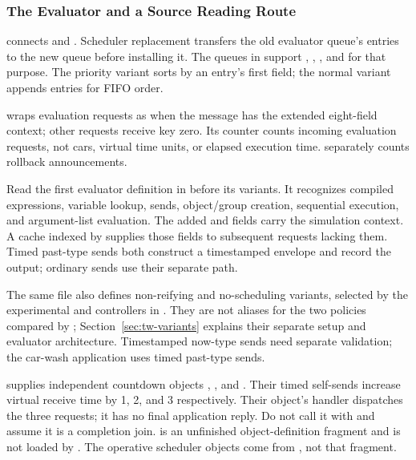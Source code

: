 

\subsubsection{The Evaluator and a Source Reading Route}
\label{sec:tw-evaluator}

 connects  and
. Scheduler replacement transfers the old
evaluator queue's entries to the new queue before installing it.
The queues in  support ,
, , and \code{[:set ...]} for that purpose.
The priority variant sorts by an entry's first field; the normal
variant appends entries for FIFO order.

 wraps evaluation requests as
 when the message has the
extended eight-field context; other requests receive key zero.
Its counter counts incoming evaluation requests, not cars,
virtual time units, or elapsed execution time.
 separately counts rollback announcements.

Read the first evaluator definition in 
before its variants. It recognizes compiled expressions, variable
lookup, sends, object/group creation, sequential execution, and
argument-list evaluation. The added  and 
fields carry the simulation context. A cache indexed by
 supplies those fields to subsequent requests lacking
them. Timed past-type sends both construct a timestamped envelope
and record the output; ordinary sends use their separate path.

The same file also defines non-reifying and no-scheduling variants,
selected by the experimental  and  controllers
in . They are not aliases for the two
policies compared by ; Section~\ref{sec:tw-variants}
explains their separate setup and evaluator architecture. Timestamped now-type sends need separate
validation; the car-wash application uses timed past-type sends.

 supplies independent countdown objects
, , and . Their timed self-sends
increase virtual receive time by 1, 2, and 3 respectively.
Their  object's handler dispatches the three requests;
it has no final application reply. Do not call it with \code{<==}
and assume it is a completion join.
 is an unfinished object-definition
fragment and is not loaded by . The operative scheduler
objects come from , not that fragment.

